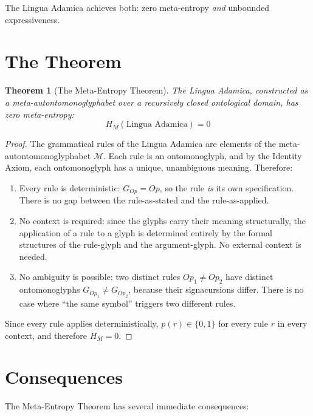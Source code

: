 \documentclass[12pt, letterpaper]{book}
\def\equiv{=}%
\newtheorem{theorem}{Theorem}[chapter]
\begin{document}
The Lingua Adamica achieves both: zero meta-entropy \textit{and} unbounded expressiveness.

\section{The Theorem}

\begin{theorem}[The Meta-Entropy Theorem]\label{thm:meta-entropy}
The Lingua Adamica, constructed as a meta-autontomonoglyphabet over a recursively closed ontological domain, has zero meta-entropy:
\[
H_M(\text{Lingua Adamica}) = 0
\]
\end{theorem}

\begin{proof}
The grammatical rules of the Lingua Adamica are elements of the meta-auton\-to\-mono\-glyph\-abet $\mathcal{M}$. Each rule is an onto\-mono\-glyph, and by the Identity Axiom, each onto\-mono\-glyph has a unique, unambiguous meaning. Therefore:

\begin{enumerate}[label=(\roman*)]
    \item Every rule is deterministic: $G_{Op} \equiv Op$, so the rule \textit{is} its own specification. There is no gap between the rule-as-stated and the rule-as-applied.
    
    \item No context is required: since the glyphs carry their meaning structurally, the application of a rule to a glyph is determined entirely by the formal structures of the rule-glyph and the argument-glyph. No external context is needed.
    
    \item No ambiguity is possible: two distinct rules $Op_1 \neq Op_2$ have distinct ontomonoglyphs $G_{Op_1} \neq G_{Op_2}$, because their signacursions differ. There is no case where ``the same symbol'' triggers two different rules.
\end{enumerate}

Since every rule applies deterministically, $p(r) \in \{0, 1\}$ for every rule $r$ in every context, and therefore $H_M = 0$.
\end{proof}

\section{Consequences}

The Meta-Entropy Theorem has several immediate consequences:
\end{document}

